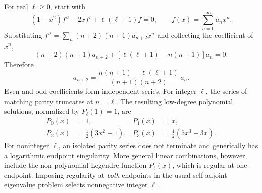 For real $\ell\ge0$, start with
\begin{equation}
(1-x^2)f''-2xf'+\ell(\ell+1)f=0,\qquad
f(x)=\sum_{n=0}^{\infty}a_nx^n.
\end{equation}
Substituting
$f''=\sum_n(n+2)(n+1)a_{n+2}x^n$
and collecting the coefficient of $x^n$,
\begin{equation}
(n+2)(n+1)a_{n+2}
+[\ell(\ell+1)-n(n+1)]a_n=0.
\end{equation}
Therefore
\begin{equation}
\boxed{a_{n+2}=
\frac{n(n+1)-\ell(\ell+1)}
{(n+1)(n+2)}\,a_n}.
\end{equation}
Even and odd coefficients form independent
series. For integer $\ell$, the series
of matching parity truncates at $n=\ell$.
The resulting low-degree polynomial solutions,
normalized by $P_\ell(1)=1$, are
\begin{align}
\boxed{P_0(x)}&=\boxed{1},&
\boxed{P_1(x)}&=\boxed{x},\\
\boxed{P_2(x)}&=\boxed{\frac12(3x^2-1)},&
\boxed{P_3(x)}&=\boxed{\frac12(5x^3-3x)}.
\end{align}
For noninteger $\ell$, an isolated parity
series does not terminate and generically has
a logarithmic endpoint singularity. More general
linear combinations, however, include the
non-polynomial Legendre function $P_\ell(x)$,
which is regular at one endpoint. Imposing
regularity at \emph{both} endpoints in the usual
self-adjoint eigenvalue problem selects
nonnegative integer $\ell$.

